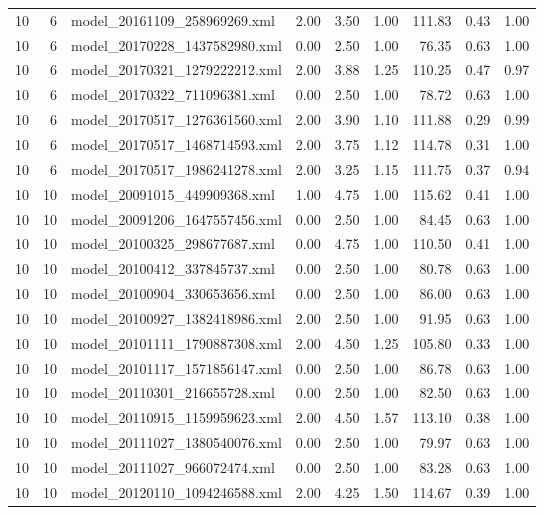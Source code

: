 \begin{table}[ht]
\begin{tabular}{rrlrrrrrr}
   10 &   6 & model\_20161109\_258969269.xml & 2.00 & 3.50 & 1.00 & 111.83 & 0.43 & 1.00 \\ 
   10 &   6 & model\_20170228\_1437582980.xml & 0.00 & 2.50 & 1.00 & 76.35 & 0.63 & 1.00 \\ 
   10 &   6 & model\_20170321\_1279222212.xml & 2.00 & 3.88 & 1.25 & 110.25 & 0.47 & 0.97 \\ 
   10 &   6 & model\_20170322\_711096381.xml & 0.00 & 2.50 & 1.00 & 78.72 & 0.63 & 1.00 \\ 
   10 &   6 & model\_20170517\_1276361560.xml & 2.00 & 3.90 & 1.10 & 111.88 & 0.29 & 0.99 \\ 
   10 &   6 & model\_20170517\_1468714593.xml & 2.00 & 3.75 & 1.12 & 114.78 & 0.31 & 1.00 \\ 
   10 &   6 & model\_20170517\_1986241278.xml & 2.00 & 3.25 & 1.15 & 111.75 & 0.37 & 0.94 \\ 
   10 &  10 & model\_20091015\_449909368.xml & 1.00 & 4.75 & 1.00 & 115.62 & 0.41 & 1.00 \\ 
   10 &  10 & model\_20091206\_1647557456.xml & 0.00 & 2.50 & 1.00 & 84.45 & 0.63 & 1.00 \\ 
   10 &  10 & model\_20100325\_298677687.xml & 0.00 & 4.75 & 1.00 & 110.50 & 0.41 & 1.00 \\ 
   10 &  10 & model\_20100412\_337845737.xml & 0.00 & 2.50 & 1.00 & 80.78 & 0.63 & 1.00 \\ 
   10 &  10 & model\_20100904\_330653656.xml & 0.00 & 2.50 & 1.00 & 86.00 & 0.63 & 1.00 \\ 
   10 &  10 & model\_20100927\_1382418986.xml & 2.00 & 2.50 & 1.00 & 91.95 & 0.63 & 1.00 \\ 
   10 &  10 & model\_20101111\_1790887308.xml & 2.00 & 4.50 & 1.25 & 105.80 & 0.33 & 1.00 \\ 
   10 &  10 & model\_20101117\_1571856147.xml & 0.00 & 2.50 & 1.00 & 86.78 & 0.63 & 1.00 \\ 
   10 &  10 & model\_20110301\_216655728.xml & 0.00 & 2.50 & 1.00 & 82.50 & 0.63 & 1.00 \\ 
   10 &  10 & model\_20110915\_1159959623.xml & 2.00 & 4.50 & 1.57 & 113.10 & 0.38 & 1.00 \\ 
   10 &  10 & model\_20111027\_1380540076.xml & 0.00 & 2.50 & 1.00 & 79.97 & 0.63 & 1.00 \\ 
   10 &  10 & model\_20111027\_966072474.xml & 0.00 & 2.50 & 1.00 & 83.28 & 0.63 & 1.00 \\ 
   10 &  10 & model\_20120110\_1094246588.xml & 2.00 & 4.25 & 1.50 & 114.67 & 0.39 & 1.00 \\ 

\end{tabular}
\end{table}
